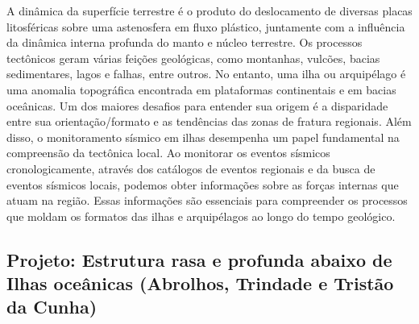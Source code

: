 \documentclass[10pt,a4paper,oneside]{book}
\begin{document}
A dinâmica da superfície terrestre é o produto do deslocamento de diversas placas litosféricas sobre uma astenosfera em fluxo plástico, juntamente com a influência da dinâmica interna profunda do manto e núcleo terrestre. Os processos tectônicos geram várias feições geológicas, como montanhas, vulcões, bacias sedimentares, lagos e falhas, entre outros. No entanto, uma ilha ou arquipélago é uma anomalia topográfica encontrada em plataformas continentais e em bacias oceânicas. Um dos maiores desafios para entender sua origem é a disparidade entre sua orientação/formato e as tendências das zonas de fratura regionais. Além disso, o monitoramento sísmico em ilhas desempenha um papel fundamental na compreensão da tectônica local. Ao monitorar os eventos sísmicos cronologicamente, através dos catálogos de eventos regionais e da busca de eventos sísmicos locais, podemos obter informações sobre as forças internas que atuam na região. Essas informações são essenciais para compreender os processos que moldam os formatos das ilhas e arquipélagos ao longo do tempo geológico.

\subsection{Projeto: Estrutura rasa e profunda abaixo de Ilhas oceânicas (Abrolhos, Trindade e Tristão da Cunha)}
\end{document}
